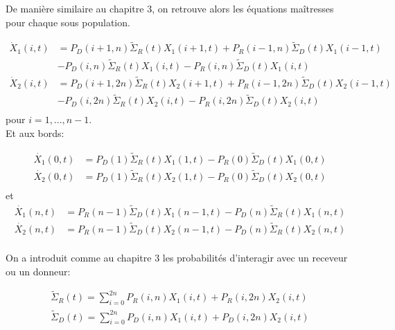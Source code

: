 De manière similaire au chapitre 3, on retrouve alors les équations maîtresses pour chaque sous population.



\begin{equation}
\begin{aligned}
\dot{X}_1(i,t) &= P_D(i+1,n) \tilde{\Sigma}_R(t) X_1(i+1,t) + P_R(i-1,n) \tilde{\Sigma}_D(t) X_1(i-1,t)\\
					&-P_D(i,n) \tilde{\Sigma}_R(t) X_1(i,t) -P_R(i,n) \tilde{\Sigma}_D(t) X_1(i,t)\\
\dot{X}_2(i,t) &= P_D(i+1,2n) \tilde{\Sigma}_R(t) X_2(i+1,t) + P_R(i-1,2n) \tilde{\Sigma}_D(t) X_2(i-1,t)\\
					&-P_D(i,2n) \tilde{\Sigma}_R(t) X_2(i,t) -P_R(i,2n) \tilde{\Sigma}_D(t) X_2(i,t)\\				
\end{aligned}
\end{equation}
pour $i = 1,...,n-1$.\\

Et aux bords:

\begin{equation}
\begin{aligned}
\dot{X_1}(0,t)&= P_D(1) \tilde{\Sigma}_R(t) X_1(1,t) - P_R(0) \tilde{\Sigma}_D(t) X_1(0,t)\\
\dot{X_2}(0,t)&= P_D(1) \tilde{\Sigma}_R(t) X_2(1,t) - P_R(0) \tilde{\Sigma}_D(t) X_2(0,t)\\
\label{bord0}
\end{aligned}
\end{equation}
 et 
\begin{equation}
\begin{aligned}
\dot{X_1}(n,t)&= P_R(n-1) \tilde{\Sigma}_D(t) X_1(n-1,t)- P_D(n) \tilde{\Sigma}_R(t) X_1(n,t)\\
\dot{X_2}(n,t)&= P_R(n-1) \tilde{\Sigma}_D(t) X_2(n-1,t)- P_D(n) \tilde{\Sigma}_R(t) X_2(n,t)\\
\label{bordN}
\end{aligned}
\end{equation}

On a introduit comme au chapitre 3 les probabilités d'interagir avec un receveur ou un donneur:

\begin{equation}
\begin{aligned}
\tilde{\Sigma}_R(t) = \sum_{i=0}^{2n} P_R(i,n) X_1(i,t)+ P_R(i,2n) X_2(i,t)\\
\tilde{\Sigma}_D(t) = \sum_{i=0}^{2n} P_D(i,n) X_1(i,t)+ P_D(i,2n) X_2(i,t)\\			
\end{aligned}
\end{equation}



